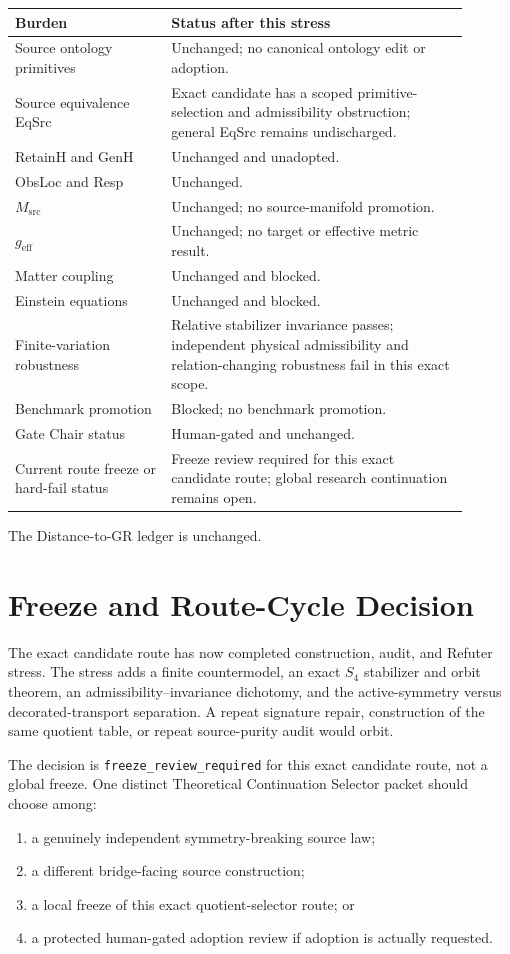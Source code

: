 \documentclass[11pt]{article}
\begin{document}
\begin{longtable}{p{0.31\linewidth}p{0.59\linewidth}}
\toprule
Burden & Status after this stress\\
\midrule
Source ontology primitives & Unchanged; no canonical ontology edit or adoption.\\
Source equivalence EqSrc & Exact candidate has a scoped primitive-selection and admissibility obstruction; general EqSrc remains undischarged.\\
RetainH and GenH & Unchanged and unadopted.\\
ObsLoc and Resp & Unchanged.\\
\(M_{\mathrm{src}}\) & Unchanged; no source-manifold promotion.\\
\(g_{\mathrm{eff}}\) & Unchanged; no target or effective metric result.\\
Matter coupling & Unchanged and blocked.\\
Einstein equations & Unchanged and blocked.\\
Finite-variation robustness & Relative stabilizer invariance passes; independent physical admissibility and relation-changing robustness fail in this exact scope.\\
Benchmark promotion & Blocked; no benchmark promotion.\\
Gate Chair status & Human-gated and unchanged.\\
Current route freeze or hard-fail status & Freeze review required for this exact candidate route; global research continuation remains open.\\
\bottomrule
\end{longtable}

The Distance-to-GR ledger is unchanged.

\section{Freeze and Route-Cycle Decision}

The exact candidate route has now completed construction, audit, and Refuter
stress. The stress adds a finite countermodel, an exact \(S_4\) stabilizer and
orbit theorem, an admissibility--invariance dichotomy, and the active-symmetry
versus decorated-transport separation. A repeat signature repair, construction
of the same quotient table, or repeat source-purity audit would orbit.

The decision is \texttt{freeze\_review\_required} for this exact candidate
route, not a global freeze. One distinct Theoretical Continuation Selector
packet should choose among:
\begin{enumerate}[leftmargin=*]
  \item a genuinely independent symmetry-breaking source law;
  \item a different bridge-facing source construction;
  \item a local freeze of this exact quotient-selector route; or
  \item a protected human-gated adoption review if adoption is actually
  requested.
\end{enumerate}
\end{document}
